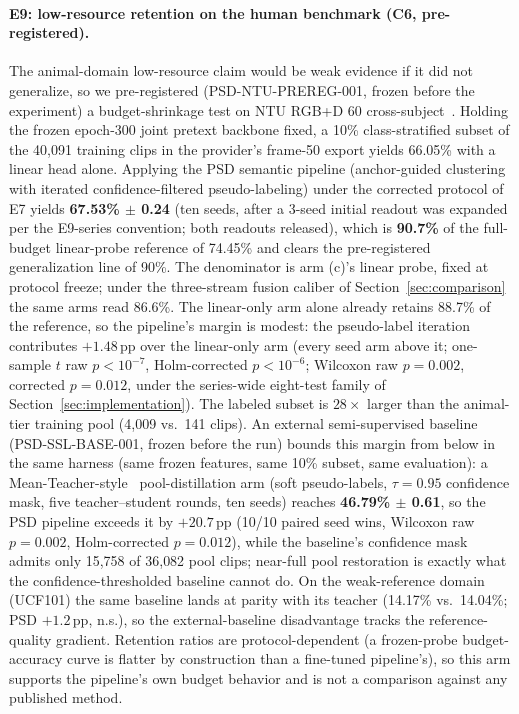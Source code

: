 \paragraph{E9: low-resource retention on the human benchmark (C6, pre-registered).}
The animal-domain low-resource claim would be weak evidence if it did not generalize, so we pre-registered (PSD-NTU-PREREG-001, frozen before the experiment) a budget-shrinkage test on NTU RGB+D 60 cross-subject~\citep{shahroudy2016ntu}. Holding the frozen epoch-300 joint pretext backbone fixed, a 10\% class-stratified subset of the 40{,}091 training clips in the provider's frame-50 export yields 66.05\% with a linear head alone. Applying the PSD semantic pipeline (anchor-guided clustering with iterated confidence-filtered pseudo-labeling) under the corrected protocol of E7 yields \textbf{67.53\% $\pm$ 0.24} (ten seeds, after a 3-seed initial readout was expanded per the E9-series convention; both readouts released), which is \textbf{90.7\%} of the full-budget linear-probe reference of 74.45\% and clears the pre-registered generalization line of 90\%. The denominator is arm (c)'s linear probe, fixed at protocol freeze; under the three-stream fusion caliber of Section~\ref{sec:comparison} the same arms read 86.6\%. The linear-only arm alone already retains 88.7\% of the reference, so the pipeline's margin is modest: the pseudo-label iteration contributes $+1.48$\,pp over the linear-only arm (every seed arm above it; one-sample $t$ raw $p<10^{-7}$, Holm-corrected $p<10^{-6}$; Wilcoxon raw $p=0.002$, corrected $p=0.012$, under the series-wide eight-test family of Section~\ref{sec:implementation}). The labeled subset is $28\times$ larger than the animal-tier training pool (4{,}009 vs.\ 141 clips). An external semi-supervised baseline (PSD-SSL-BASE-001, frozen before the run) bounds this margin from below in the same harness (same frozen features, same 10\% subset, same evaluation): a Mean-Teacher-style~\citep{tarvainen2017mean} pool-distillation arm (soft pseudo-labels, $\tau{=}0.95$ confidence mask, five teacher--student rounds, ten seeds) reaches \textbf{46.79\% $\pm$ 0.61}, so the PSD pipeline exceeds it by $+20.7$\,pp (10/10 paired seed wins, Wilcoxon raw $p=0.002$, Holm-corrected $p=0.012$), while the baseline's confidence mask admits only 15{,}758 of 36{,}082 pool clips; near-full pool restoration is exactly what the confidence-thresholded baseline cannot do. On the weak-reference domain (UCF101) the same baseline lands at parity with its teacher (14.17\% vs.\ 14.04\%; PSD $+1.2$\,pp, n.s.), so the external-baseline disadvantage tracks the reference-quality gradient. Retention ratios are protocol-dependent (a frozen-probe budget-accuracy curve is flatter by construction than a fine-tuned pipeline's), so this arm supports the pipeline's own budget behavior and is not a comparison against any published method.

